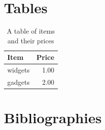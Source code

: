 \documentclass[12pt]{article}
\begin{document}
\section{Tables}
\begin{table}[ht]
\centering
\begin{tabular}{l|r}
    Item & Price \\\hline
    widgets & 1.00 \\
    gadgets & 2.00 \\
\end{tabular}
\caption{\label{tab:widgets}A table of items and their prices}
\end{table}
\newpage

\section{Bibliographies}
\cite{TestBook}
\cite{TestArticle}




\newpage
\end{document}
